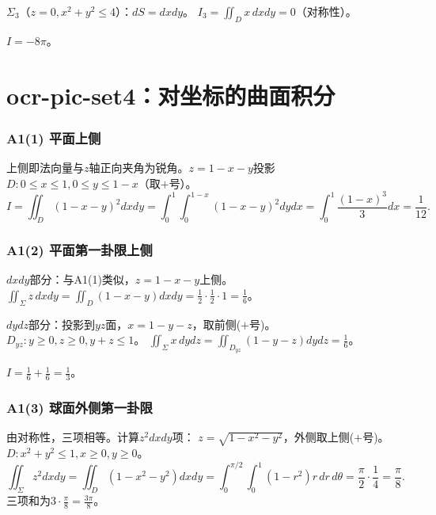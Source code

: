 \documentclass[12pt,a4paper]{ctexart}
\newcommand{\answerbox}[1]{\begin{center}\fbox{\color{red}\large\bfseries #1}\end{center}}
\begin{document}
$\Sigma_3$（$z=0,x^2+y^2\le4$）：$dS=dxdy$。
$I_3=\iint_D x\,dxdy=0$（对称性）。

$I=-8\pi$。
\answerbox{$-8\pi$}

\newpage
\part*{ocr-pic-set4：对坐标的曲面积分}

\section{A1(1) 平面上侧}


上侧即法向量与$z$轴正向夹角为锐角。$z=1-x-y$投影$D:0\le x\le1,0\le y\le1-x$（取$+$号）。
\[I=\iint_D(1-x-y)^2dxdy
   =\int_0^1\!\!\int_0^{1-x}(1-x-y)^2dydx
   =\int_0^1\frac{(1-x)^3}{3}dx=\frac1{12}.\]
\answerbox{$\frac1{12}$}

\section{A1(2) 平面第一卦限上侧}


$dxdy$部分：与A1(1)类似，$z=1-x-y$上侧。
$\iint_\Sigma z\,dxdy=\iint_D(1-x-y)dxdy=\frac12\cdot\frac12\cdot1=\frac16$。

$dydz$部分：投影到$yz$面，$x=1-y-z$，取前侧($+$号)。
$D_{yz}:y\ge0,z\ge0,y+z\le1$。
$\iint_\Sigma x\,dydz=\iint_{D_{yz}}(1-y-z)dydz=\frac16$。

$I=\frac16+\frac16=\frac13$。
\answerbox{$\frac13$}

\section{A1(3) 球面外侧第一卦限}


由对称性，三项相等。计算$z^2dxdy$项：
$z=\sqrt{1-x^2-y^2}$，外侧取上侧($+$号)。$D:x^2+y^2\le1,x\ge0,y\ge0$。
\[\iint_\Sigma z^2dxdy=\iint_D(1-x^2-y^2)dxdy
   =\int_0^{\pi/2}\!\!\int_0^1(1-r^2)r\,dr\,d\theta
   =\frac\pi2\cdot\frac14=\frac\pi8.\]
三项和为$3\cdot\frac\pi8=\frac{3\pi}{8}$。
\answerbox{$\frac{3\pi}{8}$}
\end{document}
